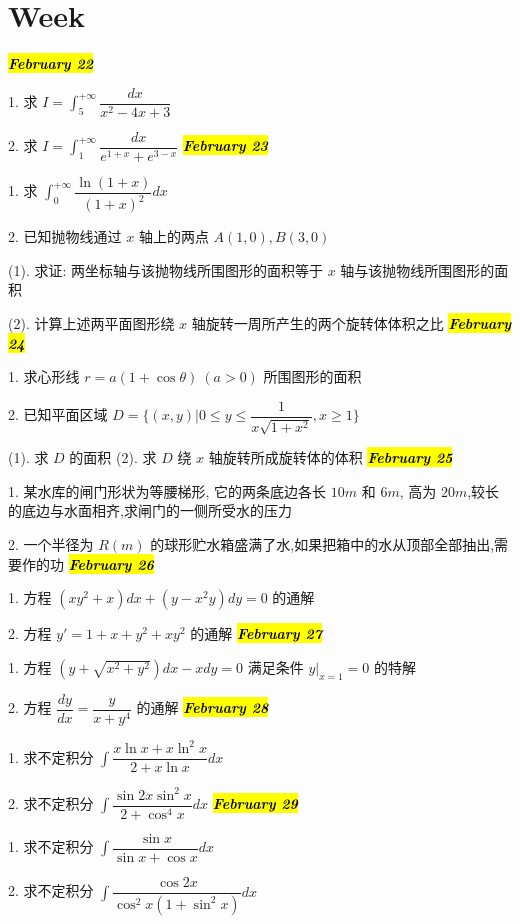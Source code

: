 \section{Week }
\hl{\textbf{\textit{February 22}}}

1. 求 $I=\int_{5}^{+\infty}\dfrac{dx}{x^{2}-4x+3}$

2. 求 $I=\int_{1}^{+\infty}\dfrac{dx}{e^{1+x}+e^{3-x}}$
\hl{\textbf{\textit{February 23}}}

1. 求 $\int_{0}^{+\infty}\dfrac{\ln(1+x)}{(1+x)^{2}}dx$

2. 已知抛物线通过 $x$ 轴上的两点 $A(1,0),B(3,0)$

(1). 求证: 两坐标轴与该抛物线所围图形的面积等于 $x$ 轴与该抛物线所围图形的面积

(2). 计算上述两平面图形绕 $x$ 轴旋转一周所产生的两个旋转体体积之比
\hl{\textbf{\textit{February 24}}}

1. 求心形线 $r=a(1+\cos\theta)\ (a>0)$ 所围图形的面积

2. 已知平面区域 $D=\{(x,y)|0\leq y\leq \dfrac{1}{x\sqrt{1+x^{2}}},x\geq 1\}$

(1). 求 $D$ 的面积
(2). 求 $D$ 绕 $x$ 轴旋转所成旋转体的体积
\hl{\textbf{\textit{February 25}}}

1. 某水库的闸门形状为等腰梯形, 它的两条底边各长 $10m$ 和 $6m$, 高为 $20m$,较长的底边与水面相齐,求闸门的一侧所受水的压力

2. 一个半径为 $R(m)$ 的球形贮水箱盛满了水,如果把箱中的水从顶部全部抽出,需要作的功
\hl{\textbf{\textit{February 26}}}

1. 方程 $(xy^{2}+x)dx+(y-x^{2}y)dy=0$ 的通解

2. 方程 $y'=1+x+y^{2}+xy^{2}$ 的通解
\hl{\textbf{\textit{February 27}}}

1. 方程 $(y+\sqrt{x^{2}+y^{2}})dx-xdy=0$ 满足条件 $y|_{x=1}=0$ 的特解

2. 方程 $\dfrac{dy}{dx}=\dfrac{y}{x+y^{4}}$ 的通解
\hl{\textbf{\textit{February 28}}}

1. 求不定积分 $\int\dfrac{x\ln x+x\ln^{2}x}{2+x\ln x}dx$

2. 求不定积分 $\int\dfrac{\sin 2x\sin^{2}x}{2+\cos^{4} x}dx$
\hl{\textbf{\textit{February 29}}}

1. 求不定积分 $\int\dfrac{\sin x}{\sin x+\cos x}dx$

2. 求不定积分 $\int\dfrac{\cos 2x}{\cos^{2} x(1+\sin^{2} x)}dx$
